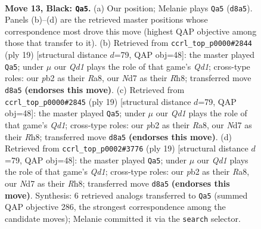 \documentclass[11pt]{article}
\begin{document}
\clearpage

\begin{figure}[p]\centering
\begin{subfigure}{0.46\textwidth}\centering
\resizebox{\linewidth}{!}{%
\newchessgame
\chessboard[
  setfen={r1bq3r/p2nkppp/2pbpn2/8/Np1P1P1N/3BP3/PP4PP/R1BQ1RK1 b - - 0 13},
  showmover=false,
  pgfstyle=straightmove, color=movearrow, markmove={d8-a5}
]}
\caption{}
\end{subfigure}\hfill
\begin{subfigure}{0.46\textwidth}\centering
\resizebox{\linewidth}{!}{%
\newchessgame
\chessboard[
  setfen={r1bqkb1r/3n1ppp/p2ppn2/8/Np1NP3/4BP2/PPPQ2PP/2KR1B1R b kq - 3 10},
  showmover=false,
  pgfstyle=straightmove, color=movearrow, markmove={d8-a5}
]}
\caption{}
\end{subfigure}
\\[4pt]
\begin{subfigure}{0.46\textwidth}\centering
\resizebox{\linewidth}{!}{%
\newchessgame
\chessboard[
  setfen={r1bqkb1r/3n1ppp/p2ppn2/8/Np1NP3/4BP2/PPPQ2PP/2KR1B1R b kq - 3 10},
  showmover=false,
  pgfstyle=straightmove, color=movearrow, markmove={d8-a5}
]}
\caption{}
\end{subfigure}\hfill
\begin{subfigure}{0.46\textwidth}\centering
\resizebox{\linewidth}{!}{%
\newchessgame
\chessboard[
  setfen={r1bqkb1r/3n1ppp/p2ppn2/8/Np1NP3/4BP2/PPPQ2PP/2KR1B1R b kq - 3 10},
  showmover=false,
  pgfstyle=straightmove, color=movearrow, markmove={d8-a5}
]}
\caption{}
\end{subfigure}
\caption{\textbf{Move 13, Black: \texttt{Qa5}.} (a) Our position; Melanie plays \texttt{Qa5} (\texttt{d8a5}). Panels (b)--(d) are the retrieved master positions whose correspondence most drove this move (highest QAP objective among those that transfer to it). (b) Retrieved from \texttt{ccrl\_top\_p0000\#2844} (ply 19) [structural distance $d$=79, QAP obj=48]: the master played \texttt{Qa5}; under $\mu$ our \emph{Qd1} plays the role of that game's \emph{Qd1}; cross-type roles: our \emph{p}b2 as their \emph{R}a8, our \emph{N}d7 as their \emph{R}h8; transferred move \texttt{d8a5} \textbf{(endorses this move)}. (c) Retrieved from \texttt{ccrl\_top\_p0000\#2845} (ply 19) [structural distance $d$=79, QAP obj=48]: the master played \texttt{Qa5}; under $\mu$ our \emph{Qd1} plays the role of that game's \emph{Qd1}; cross-type roles: our \emph{p}b2 as their \emph{R}a8, our \emph{N}d7 as their \emph{R}h8; transferred move \texttt{d8a5} \textbf{(endorses this move)}. (d) Retrieved from \texttt{ccrl\_top\_p0002\#3776} (ply 19) [structural distance $d$=79, QAP obj=48]: the master played \texttt{Qa5}; under $\mu$ our \emph{Qd1} plays the role of that game's \emph{Qd1}; cross-type roles: our \emph{p}b2 as their \emph{R}a8, our \emph{N}d7 as their \emph{R}h8; transferred move \texttt{d8a5} \textbf{(endorses this move)}. Synthesis: 6 retrieved analogs transferred to \texttt{Qa5} (summed QAP objective 286, the strongest correspondence among the candidate moves); Melanie committed it via the \texttt{search} selector.}
\label{fig:thought-m25}
\end{figure}
\end{document}
